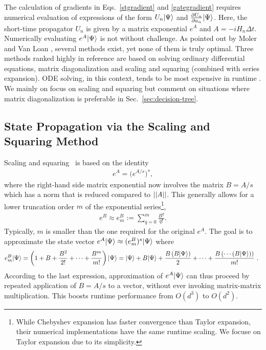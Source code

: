 The calculation of gradients in Eqs.\ \eqref{stgradient} and \eqref{gategradient} requires numerical evaluation of expressions of the form $U_n|\Psi\rangle$  and $\frac{\partial U_n}{\partial a_n} |\Psi\rangle$. 
Here, the short-time propagator $U_n$ is given by a matrix exponential $e^A$ and $A=-iH_n\Delta t$. 
Numerically evaluating  $e^A|\Psi\rangle$ is not without challenge. As pointed out by Moler and Van Loan \cite{expmoler2003nineteen}, several methods exist, yet none of them is truly optimal. Three methods ranked highly in reference \cite{expmoler2003nineteen} are based on solving ordinary differential equations, matrix diagonalization and scaling and squaring (combined with series expansion). ODE solving, in this context, tends to be most expensive in runtime \cite{semiadgoerz2022quantum}. We mainly on focus on scaling and squaring but comment on situations where matrix diagonalization is preferable in Sec.\ \ref{sec:decision-tree}. 

\subsection{State Propagation via the Scaling and Squaring Method}
\label{subsec:scaling-squaring}

Scaling and squaring~\cite{codenotti1992error} is based on the identity
\begin{align}
\label{eq:scaling_squaring}
   e^A=\big(e^{A/s}\big)^s,
\end{align}
where the right-hand side matrix exponential now involves the matrix $B=A/s$ which has a norm that is reduced compared to $\left|\left|A\right|\right|$. This generally allows for a lower truncation order $m $ of the exponential series\footnote{While Chebyshev expansion has faster convergence than Taylor expansion, their numerical implementations have the same runtime scaling. We focuse on Taylor expansion due to its simplicity.}, 
\begin{align}
\label{eq:eBm}
    e^B\approx e^B_m:=\sum_{q=0}^m\frac{ B^q}{q!}.
\end{align}
Typically, $m$ is smaller than the one required for the original $e^A$.
The goal is to approximate the state vector $e^A |\Psi\rangle\approx (e^B_m)^s|\Psi\rangle$ where 
\begin{equation}
\label{eq:eBmpsi}
   e^B_m|\Psi\rangle= \left(1+B+\frac{B^2}{2!}+\cdots+\frac{B^m}{m!}\right)|\Psi\rangle
   =|\Psi\rangle+B|\Psi\rangle+\frac{B\left(B|\Psi\rangle\right)}{2}+\cdots+\frac{B\left(\cdots \left(B|\Psi\rangle\right)\right)}{m!}\text{   . }
\end{equation}
According to the last expression, approximation of $e^A|\Psi\rangle$ can thus proceed by repeated application of $B=A/s$ to a vector, without ever invoking matrix-matrix multiplication. This boosts runtime performance from $O(d^3)$ to $O(d^2)$.

